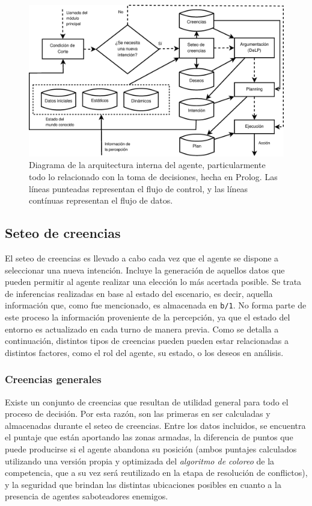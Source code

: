 \begin{figure}[ht]
\centering
\includegraphics[scale=.3]{graficos/eps/agent_prolog.eps}
\caption{Diagrama de la arquitectura interna del agente,
particularmente todo lo relacionado con la toma de decisiones, hecha
en Prolog.
Las líneas punteadas representan el flujo de control, y
las líneas contínuas representan el flujo de datos.}
\label{fig:agent_prolog}
\end{figure}

\subsection{Seteo de creencias}
\label{sec:seteo_de_creencias}

El seteo de creencias es llevado a cabo cada vez que el agente se
dispone a seleccionar una nueva intención.
Incluye la generación de aquellos datos que pueden permitir al agente
realizar una elección lo más acertada posible.
Se trata de inferencias realizadas en base al estado del escenario, es
decir, aquella información que, como fue mencionado, es almacenada en
\texttt{b/1}.
No forma parte de este proceso la información proveniente de la
percepción, ya que el estado del entorno es actualizado en cada turno
de manera previa.
Como se detalla a continuación, distintos tipos de creencias pueden
pueden estar relacionadas a distintos factores, como el rol del
agente, su estado, o los deseos en análisis.

\subsubsection{Creencias generales}
\label{sec:creencias_generales}

Existe un conjunto de creencias que resultan de utilidad general para
todo el proceso de decisión.
Por esta razón, son las primeras en ser calculadas y almacenadas
durante el seteo de creencias.
Entre los datos incluidos, se encuentra el puntaje que están aportando
las zonas armadas, la diferencia de puntos que puede producirse si el
agente abandona su posición (ambos puntajes calculados utilizando una
versión propia y optimizada del \textit{algoritmo de coloreo} de la
competencia, que a su vez será reutilizado en la etapa de resolución
de conflictos), y la seguridad que brindan las distintas ubicaciones
posibles en cuanto a la presencia de agentes saboteadores enemigos.

